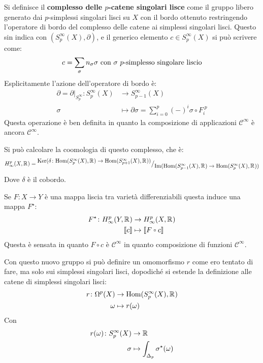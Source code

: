 \begin{definition}
  Si definisce il \textbf{complesso delle $ p $-catene singolari
    lisce} come il gruppo libero
  generato dai $ p $-simplessi singolari lisci su $ X $ con il bordo ottenuto
  restringendo l'operatore di bordo del complesso delle catene ai simplessi
  singolari lisci. Questo sin indica con $ (S^\infty_p(X), \partial) $, e il generico
  elemento $ c \in S^\infty_p(X) $ si può scrivere come:
  \[
    c = \sum_\sigma n_\sigma \sigma \text{ con $ \sigma $ $ p $-simplesso singolare liscio}
  \]
  Esplicitamente l'azione dell'operatore di bordo è:
  \begin{align*}
    \partial = \partial \lvert_{S^\infty_p} \colon S_p^\infty(X) & \to S^\infty_{p-1}(X) \\
    \sigma & \mapsto \partial \sigma = \sum_{i=0}^p (-)^i \sigma \circ F_i^{\; p}
  \end{align*}
  Questa operazione è ben definita in quanto la composizione di applicazioni
  $ \mathcal{C}^\infty $ è ancora $ \mathcal{C}^\infty $.
\end{definition}
Si può calcolare la coomologia di questo complesso, che è:
\[
  H^p_\infty(X, \mathbb{R}^{}) = {^{\textstyle \mathrm{Ker}(  \delta \colon \mathrm{Hom}( S^\infty_p(X), \mathbb{R}^{}) \to \mathrm{Hom}( S^\infty_{p+1}(X), \mathbb{R}^{}))}\big/_{\textstyle \mathrm{Im}( \mathrm{Hom}( S^\infty_{p-1}(X), \mathbb{R}^{}) \to  \mathrm{Hom}( S^\infty_p(X), \mathbb{R}^{}) )}}
\]
Dove $ \delta $ è il cobordo.
\begin{osservation}
  Se $ F \colon X \to Y $ è una mappa liscia tra varietà differenziabili
  questa induce una mappa $ F^\star $:
  \begin{align*}
    F^\star \colon H^p_\infty(Y, \RN{}) & \to H^p_\infty(X, \RN{}) \\
    \llbracket c \rrbracket & \mapsto \llbracket F \circ c \rrbracket
  \end{align*}
  Questa è sensata in quanto $ F \circ c $ è $ \mathcal{C}^\infty $ in quanto
  composizione di funzioni $ \mathcal{C}^\infty $.
\end{osservation}
Con questo nuovo gruppo si può definire un omomorfismo $ r $ come ero tentato
di fare, ma solo sui simplessi singolari lisci, dopodiché si estende
la definizione alle catene di simplessi singolari lisci:
\begin{align*}
  r \colon \Omega^p(X) & \to \mathrm{Hom}( S_p^\infty(X), \mathbb{R}^{}) \\
  \omega & \mapsto r(\omega)
\end{align*}
Con
\begin{align*}
  r(\omega) \colon S_p^\infty(X) & \to \mathbb{R}^{} \\
  \sigma & \mapsto \int_{\Delta_p} \sigma^\star(\omega)
\end{align*}
